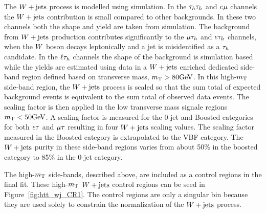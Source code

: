 The $W+\text{jets}$ process is modelled using simulation.
In the $\tau_{h}\tau_{h}$ and $e\mu$ channels the $W+\text{jets}$ contribution 
is small compared to other backgrounds. In these two channels both the shape and 
yield are taken from simulation.
The background from $W+\text{jets}$ production contributes significantly to the
$\mu\tau_{h}$ and $e\tau_{h}$ channels, when the $W$ boson decays leptonically and
a jet is misidentified as a $\tau_{h}$ candidate. In the $\ell\tau_{h}$ channels
the shape of the background is simulation based while the yields are estimated 
using data in a $W+\text{jets}$ enriched dedicated side-band region defined
based on transverse mass, $m_\mathrm{T} > 80\mathrm{GeV}$. In this high-$m_\mathrm{T}$ side-band region, the $W+\text{jets}$
process is scaled so that the sum total of expected background events is equivalent
to the sum total of observed data events. The scaling factor is then applied
in the low transverse mass signale regions $m_\mathrm{T} < 50\mathrm{GeV}$. A scaling factor
is measured for the 0-jet and Boosted categories for both $e\tau$ and $\mu\tau$ resulting
in four $W+\text{jets}$ scaling values. The scaling factor measured in the Boosted
category is extrapolated to the VBF category. The $W+\text{jets}$ purity in these
side-band regions varies from about 50\% in the boosted category to 85\% in the 0-jet category.

The high-$m_\mathrm{T}$ side-bands, described above, are included as a control regions in the final fit.
These high-$m_\mathrm{T}$ $W+\text{jets}$ control regions can be seed in Figure~\ref{fig:htt_wj_CR1}.
The control regions are only a singular bin because they are used solely to constrain 
the normalization of the $W+\text{jets}$ process.

